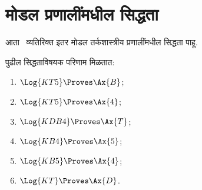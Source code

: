 \section{मोडल प्रणालींमधील सिद्धता}\label{nml:prf:prs:sec}

आता~ व्यतिरिक्त इतर मोडल तर्कशास्त्रीय
प्रणालींमधील सिद्धता पाहू.

\begin{prop}\label{nml:prf:prs:prop:S5facts}
पुढील सिद्धताविषयक परिणाम मिळतात:
  \begin{enumerate}
  \item $\Log{KT5} \Proves \Ax{B}$;
  \item $\Log{KT5} \Proves \Ax{4}$;
  \item $\Log{KDB4} \Proves \Ax{T}$;
  \item $\Log{KB4} \Proves \Ax{5}$;
  \item $\Log{KB5} \Proves \Ax{4}$;
  \item \label{nml:prf:prs:prop:S5facts-KT-D}$\Log{KT} \Proves \Ax{D}$.
  \end{enumerate}
\end{prop}

